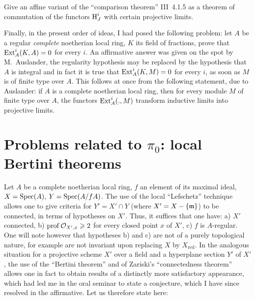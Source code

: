 \begin{problem} \label{XIII.1.4}
Give an affine variant of the ``comparison theorem'' \textup{\EGA III~4.1.5} as a theorem of commutation of the functors $\operatorname{H}^i_J$ with certain projective limits.
\end{problem}

Finally, in the present order of ideas, I had posed the following problem: let $A$ be a regular \emph{complete} noetherian local ring, $K$ its field of fractions, prove that $\operatorname{Ext}^i_A(K, A)=0$ for every $i$. An affirmative answer was given on the spot by M.~Auslander, the regularity hypothesis may be replaced by the hypothesis that $A$ is integral and in fact it is true that $\operatorname{Ext}^i_A(K, M)=0$ for every $i$, as soon as $M$ is of finite type over $A$. This follows at once from the following statement, due to Auslander: if $A$ is a complete noetherian local ring, then for every module $M$ of finite type over $A$, the functors $\operatorname{Ext}_A^i(., M)$ transform inductive limits into projective limits.

\section{Problems related to $\pi_0$: local Bertini theorems} \label{XIII.2}

Let $A$ be a complete noetherian local ring, $f$ an element of its
maximal ideal, $X=\operatorname{Spec} (A)$, $Y=\operatorname{Spec}(A/fA)$. The use of the
local ``Lefschetz'' technique allows one to give criteria
for $Y'=X'\cap Y$ (where $X'=X-\{\mathfrak{m}\}$) to be connected, in terms
of hypotheses on $X'$. Thus, it suffices that one have: a) $X'$
connected, b) $\operatorname{prof} {\mathcal O}_{X', x} \geqslant 2$ for every closed point $x$
of $X'$, c) $f$ is $A$-regular. One will note however that
hypotheses b) and c) are not of a purely
topological nature, for example are not invariant upon
replacing $X$ by $X_{\text{red}}$. In the analogous situation
for a projective scheme $X'$ over a field and a hyperplane
section $Y'$ of $X'$, the use of the ``Bertini
theorem'' and of Zariski's ``connectedness theorem'' allows
one in fact to obtain results of a distinctly more
satisfactory appearance, which had led me in the oral seminar to
state a conjecture, which I have since resolved in the affirmative.
Let us therefore state here:

